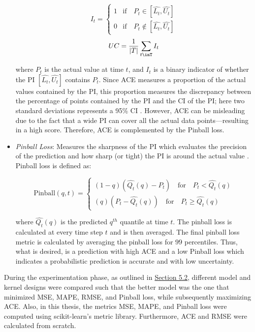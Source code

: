 \begin{itemize}
    
    \begin{equation}
        I_t = 
    \begin{cases}
      1 & \text{if} \quad P_t \in [\hat{L_t}, \hat{U_t}] \\
      0 & \text{if} \quad P_t \notin [\hat{L_t}, \hat{U_t}]
    \end{cases}
    \end{equation}
    \begin{equation}
        UC = \frac{1}{|T|}\sum_{t\inT}I_t
    \end{equation}
    
    where $P_t$ is the actual value at time $t$, and $I_t$ is a binary indicator of whether the PI $ [\hat{L_t}, \hat{U_t}]$ contains $P_t$. Since ACE measures a proportion of the actual values contained by the PI, this proportion measures the discrepancy between the percentage of points contained by the PI and the \ac{CI} of the PI; here two standard deviations represents a 95\% CI \cite{gp_prices}. However, ACE can be misleading due to the fact that a wide PI can cover all the actual data points—resulting in a high score. Therefore, ACE is complemented by the Pinball loss.
    
    \item \textit{Pinball Loss}: Measures the sharpness of the PI which evaluates the precision of the prediction and how sharp (or tight) the PI is around the actual value \cite{gp_prices}. Pinball loss is defined as:
    
    \begin{equation}
        \text{Pinball}(q, t) = 
        \begin{cases}
        (1 - q)(\hat{Q_t}(q) - P_t) \quad \text{for} \quad P_t < \hat{Q_t}(q) \\
        (q)(P_t - \hat{Q_t}(q)) \quad \text{for} \quad P_t \ge \hat{Q_t}(q) 
        \end{cases}    
    \end{equation}
    
    where $\hat{Q_t}(q)$ is the predicted $q^{th}$ quantile at time $t$. The pinball loss is calculated at every time step $t$ and is then averaged. The final pinball loss metric is calculated by averaging the pinball loss for $99$ percentiles. Thus, what is desired, is a prediction with high ACE and a low Pinball loss which indicates a probabilistic prediction is accurate and with low uncertainty.
    
\end{itemize}

During the experimentation phase, as outlined in \hyperlink{subsection.5.2}{Section 5.2}, different model and kernel designs were compared such that the better model was the one that minimized MSE, MAPE, RMSE, and Pinball loss, while subsequently maximizing ACE. Also, in this thesis, the metrics MSE, MAPE, and Pinball loss were computed using scikit-learn's \cite{scikit-learn} metric library. Furthermore, ACE and RMSE were calculated from scratch. 



